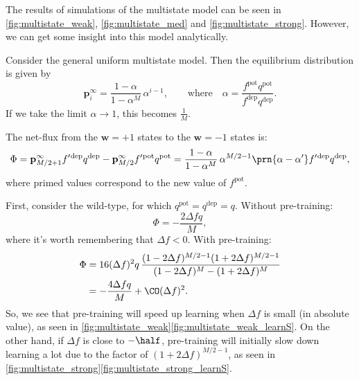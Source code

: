 \documentclass[12pt]{article}
\newcommand{\pr}{\mathbf{p}}
\newcommand{\eq}{\pr^\infty}
\newcommand{\w}{\mathbf{w}}
\newcommand{\pot}{^{\text{pot}}}
\newcommand{\dep}{^{\text{dep}}}
\begin{document}




The results of simulations of the multistate model can be seen in \autoref{fig:multistate_weak}, \autoref{fig:multistate_med} and \autoref{fig:multistate_strong}.
However, we can get some insight into this model analytically.



Consider the general uniform multistate model.
Then the equilibrium distribution is given by
%
\begin{equation}\label{eq:mutltieq}
  \eq_i = \frac{1-\alpha}{1-\alpha^M}\,\alpha^{i-1},
  \qquad \text{where} \quad
  \alpha=\frac{f\pot q\pot}{f\dep q\dep}.
\end{equation}
%
If we take the limit $\alpha\rightarrow1$, this becomes $\frac{1}{M}$.

The net-flux from the $\w=+1$ states to the $\w=-1$ states is:
%
\begin{equation}\label{eq:multiflux}
  \Phi = \eq_{M/2+1}f'{}\dep q\dep - \eq_{M/2}f'{}\pot q\pot = \frac{1-\alpha}{1-\alpha^M}\,\alpha^{M/2-1}\prn{\alpha-\alpha'}f'{}\dep q\dep,
\end{equation}
%
where primed values correspond to the new value of $f\pot$.

First, consider the wild-type, for which $q\pot=q\dep=q$.
Without pre-training:
%
\begin{equation}\label{eq:multiWTnopre}
  \Phi = -\frac{2\Delta fq}{M},
\end{equation}
%
where it's worth remembering that $\Delta f<0$.
With pre-training:
%
\begin{equation}\label{eq:multiWTpre}
\begin{aligned}
  \Phi &= 16(\Delta f)^2q \, \frac{(1-2\Delta f)^{M/2-1} (1+2\Delta f)^{M/2-1}}
          {(1-2\Delta f)^M - (1+2\Delta f)^M} \\
       &= -\frac{4\Delta fq}{M} + \CO(\Delta f)^2.
\end{aligned}
\end{equation}
%
So, we see that pre-training will speed up learning when $\Delta f$ is small (in absolute value), as seen in \autoref{fig:multistate_weak}\ref{fig:multistate_weak_learnS}.
On the other hand, if $\Delta f$ is close to $-\half$, pre-training will initially slow down learning a lot due to the factor of $(1+2\Delta f)^{M/2-1}$, as seen in \autoref{fig:multistate_strong}\ref{fig:multistate_strong_learnS}.
\end{document}

